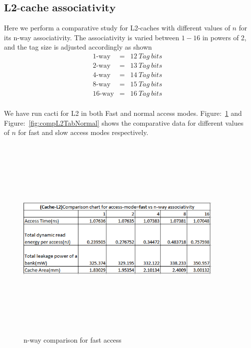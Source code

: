\documentclass{tufte-handout}
\begin{document}
	\subsection{$\textbf{L2-cache associativity}$}
	Here we perform a comparative study for L2-caches with different values of $n$ for its n-way associativity. The associativity is varied between $1-16$ in powers of 2, and the tag size is adjusted accordingly as shown
	\begin{eqnarray*}
		\mbox{1-way} &=& 12\ Tag\ bits \\
		\mbox{2-way} &=& 13\ Tag\ bits \\
		\mbox{4-way} &=& 14\ Tag\ bits \\
		\mbox{8-way} &=& 15\ Tag\ bits \\
		\mbox{16-way} &=& 16\ Tag\ bits \\
	\end{eqnarray*}

	We have run cacti for L2 in both Fast and normal access modes. Figure:~\ref{fig:compL2TabFast} and Figure:~\ref{fig:compL2TabNormal} shows the comparative data for different values of $n$ for fast and slow access modes respectively.
		\begin{figure}[h!]
		\label{fig:compL2TabFast}
		\centering
		\includegraphics[width = 4in, height = 4in]{compL2TabFast}
		\caption{n-way comparison for fast access }
		\end{figure}
\end{document}
